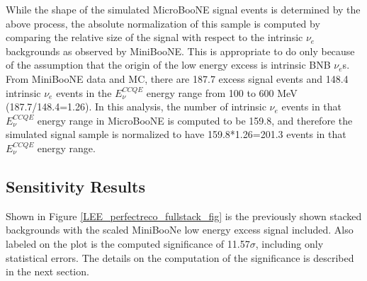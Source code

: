 While the shape of the simulated MicroBooNE signal events is determined by the above process, the absolute normalization of this sample is computed by comparing the relative size of the signal with respect to the intrinsic $\nu_e$ backgrounds as observed by MiniBooNE. This is appropriate to do only because of the assumption that the origin of the low energy excess is intrinsic BNB $\nu_e$s. From MiniBooNE data and MC, there are 187.7 excess signal events and 148.4 intrinsic $\nu_e$ events in the $E_\nu^{CCQE}$ energy range from 100 to 600 MeV (187.7/148.4=1.26). In this analysis, the number of intrinsic $\nu_e$ events in that $E_\nu^{CCQE}$ energy range in MicroBooNE is computed to be 159.8, and therefore the simulated signal sample is normalized to have 159.8*1.26=201.3 events in that $E_\nu^{CCQE}$ energy range.\\





















\subsection{Sensitivity Results}

Shown in Figure \ref{LEE_perfectreco_fullstack_fig} is the previously shown stacked backgrounds with the scaled MiniBooNe low energy excess signal included. Also labeled on the plot is the computed significance of 11.57$\sigma$, including only statistical errors. The details on the computation of the significance is described in the next section.

